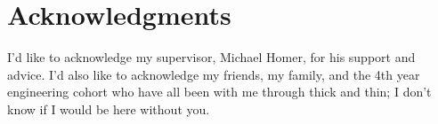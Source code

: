 \chapter*{Acknowledgments} \label{C:ack} 
I'd like to acknowledge my supervisor, Michael Homer, for his support and advice. I'd also like to acknowledge my friends, my family, and the 4th year engineering cohort who have all been with me through thick and thin; I don't know if I would be here without you.
